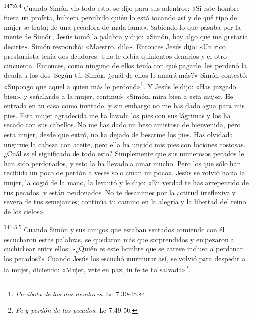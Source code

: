 \par
\textsuperscript{147:5.4} Cuando Simón vio todo esto, se dijo para sus adentros: «Si este hombre fuera un profeta, hubiera percibido quién lo está tocando así y de qué tipo de mujer se trata; de una pecadora de mala fama». Sabiendo lo que pasaba por la mente de Simón, Jesús tomó la palabra y dijo: «Simón, hay algo que me gustaría decirte». Simón respondió: «Maestro, dilo». Entonces Jesús dijo: «Un rico prestamista tenía dos deudores. Uno le debía quinientos denarios y el otro cincuenta. Entonces, como ninguno de ellos tenía con qué pagarle, les perdonó la deuda a los dos. Según tú, Simón, ¿cuál de ellos lo amará más?» Simón contestó: «Supongo que aquel a quien más le perdonó»\footnote{\textit{Parábola de los dos deudores}: Lc 7:39-48.}. Y Jesús le dijo: «Has juzgado bien», y señalando a la mujer, continuó: «Simón, mira bien a esta mujer. He entrado en tu casa como invitado, y sin embargo no me has dado agua para mis pies. Esta mujer agradecida me ha lavado los pies con sus lágrimas y los ha secado con sus cabellos. No me has dado un beso amistoso de bienvenida, pero esta mujer, desde que entró, no ha dejado de besarme los pies. Has olvidado ungirme la cabeza con aceite, pero ella ha ungido mis pies con lociones costosas. ¿Cuál es el significado de todo esto? Simplemente que sus numerosos pecados le han sido perdonados, y esto la ha llevado a amar mucho. Pero los que sólo han recibido un poco de perdón a veces sólo aman un poco». Jesús se volvió hacia la mujer, la cogió de la mano, la levantó y le dijo: «En verdad te has arrepentido de tus pecados, y están perdonados. No te desanimes por la actitud irreflexiva y severa de tus semejantes; continúa tu camino en la alegría y la libertad del reino de los cielos».

\par
\textsuperscript{147:5.5} Cuando Simón y sus amigos que estaban sentados comiendo con él escucharon estas palabras, se quedaron más que sorprendidos y empezaron a cuchichear entre ellos: «¿Quién es este hombre que se atreve incluso a perdonar los pecados?» Cuando Jesús los escuchó murmurar así, se volvió para despedir a la mujer, diciendo: «Mujer, vete en paz; tu fe te ha salvado»\footnote{\textit{Fe y perdón de los pecados}: Lc 7:49-50.}.

